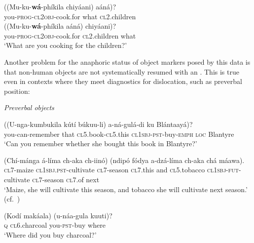 \documentclass[output=paper]{LSP/langsci}
\begin{document}
\begin{exe}
\ex
\label{02-do-ex:15}%
\begin{xlist}

\ex
\label{02-do-ex:15a}%
\gll ((Mu-ku-\textbf{wá}-phíkila chiyáani) aáná)?\\
	you-\textsc{prog}-\textsc{cl2obj}-cook.for	what \textsc{cl2}.children\\

\ex
\label{02-do-ex:15b}%
\gll ((Mu-ku-\textbf{wá}-phíkila aáná) chiyáani)?\\
	you-\textsc{prog}-\textsc{cl2obj}-cook.for	\textsc{cl2}.children what\\
\glt ‘What are you cooking for the children?’
\end{xlist}
\end{exe}

Another problem for the anaphoric status of object markers posed by this data is that non-human objects are not systematically resumed with an . 
This is true even in contexts where they meet diagnostics for dislocation, such as preverbal position:

\newpage 
\begin{exe}
\ex
\label{02-do-ex:16-18}%
\emph{Preverbal objects}\\
\begin{xlist}
\ex %
\label{02-do-ex:16}
\gll ((U-nga-kumbukila 	kútí 	búkuu-li)				a-ná-gulá-di 				ku 	Blántaayá)?\\
	 you-can-remember	 	that	\textsc{cl5}.book-\textsc{cl5}.this		\textsc{cl1sbj}-\textsc{pst}-buy-\textsc{emph}	\textsc{loc} 	Blantyre\\
\glt ‘Can you remember whether she bought this book in Blantyre?’
	

\ex %
\label{02-do-ex:17}
\gll (Chí-mánga 	á-líma 					ch-aka 		ch-iinó) 		(ndipó 	fódya a-dzá-líma 				ch-aka 		chá 		máawa).\\
\textsc{cl7}-maize		\textsc{cl1sbj}.\textsc{pst}-cultivate	\textsc{cl7}-season	\textsc{cl7}.this		 and		\textsc{cl5}.tobacco	\textsc{cl1sbj}-\textsc{fut}-cultivate 	\textsc{cl7}-season	\textsc{cl7}.of	next\\
\glt ‘Maize, she will cultivate this season, and tobacco she will cultivate next season.’ (cf.~)

\ex%
\label{02-do-ex:18}
\gll (Kodí		makáala) 		(u-náa-gula 	kuuti)?\\
\textsc{q}			\textsc{cl6}.charcoal	you-\textsc{pst}-buy	where\\
\glt 	‘Where did you buy charcoal?’
\end{xlist}
\end{exe}
\end{document}
